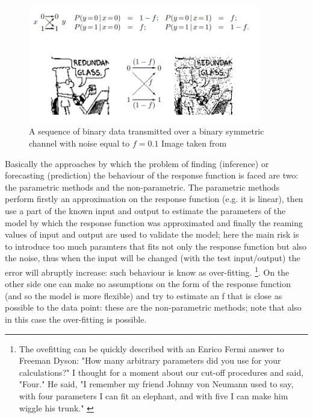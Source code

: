 \documentclass[
12pt, %
a4paper, %
oneside, %
headinclude,footinclude, %
BCOR5mm, %
]{scrartcl}
\begin{document}
\begin{figure}[h]
\begin{center}
\includegraphics[width=0.9\textwidth]{Pic/Noisy_channel.png}
\caption{A sequence of binary data transmitted over a binary symmetric channel with noise equal to $f=0.1$   Image taken from \cite{mackay2003information}}
\label{Noisy_channel}
\end{center}
\end{figure}
Basically the approaches by which the problem of finding (inference) or forecasting (prediction) the behaviour of the response function is faced are two: the parametric methods and the non-parametric. The parametric methods perform firstly an approximation on the response function (e.g. it is linear), then use a part of the known input and output to estimate the parameters of the model by which the response function was approximated and finally the reaming values of input and output are used to validate the model; here the main risk is to introduce too much paramters that fits not only the response function but also the noise, thus when the input will be changed (with the test input/output) the error will abruptly increase: such behaviour is know as over-fitting. \footnote{The ovefitting can be quickly described with an Enrico Fermi answer to Freeman Dyson: "How many arbitrary parameters did you use for your calculations?" I thought for a moment about our cut-off procedures and said, "Four." He said, "I remember my friend Johnny von Neumann used to say, with four parameters I can fit an elephant, and with five I can make him wiggle his trunk." \cite{dyson}}. On the other side one can make no assumptions on the form of the response function (and so the model is more flexible) and try to estimate an f that is close as possible to the data point: these are the non-parametric methods; note that also in this case the over-fitting is possible. 


\clearpage
\end{document}
